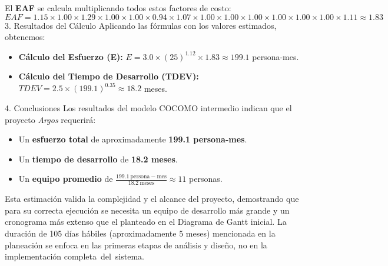 El \textbf{EAF} se calcula multiplicando todos estos factores de costo:
$EAF = 1.15 \times 1.00 \times 1.29 \times 1.00 \times 1.00 \times 0.94 \times 1.07 \times 1.00 \times 1.00 \times 1.00 \times 1.00 \times 1.00 \times 1.00 \times 1.11 \approx 1.83$
 3. Resultados del Cálculo
Aplicando las fórmulas con los valores estimados, obtenemos:
\begin{itemize}
    \item \textbf{Cálculo del Esfuerzo (E):}
    $E = 3.0 \times \left(25\right)^{1.12} \times 1.83 \approx 199.1$ persona-mes.
    \item \textbf{Cálculo del Tiempo de Desarrollo (TDEV):}
    $TDEV = 2.5 \times \left(199.1\right)^{0.35} \approx 18.2$ meses.
\end{itemize}

4. Conclusiones
Los resultados del modelo COCOMO intermedio indican que el proyecto \textit{Argos} requerirá:
\begin{itemize}
    \item Un \textbf{esfuerzo total} de aproximadamente \textbf{199.1 persona-mes}.
    \item Un \textbf{tiempo de desarrollo} de \textbf{18.2 meses}.
    \item Un \textbf{equipo promedio} de $\frac{199.1\ \mathrm{persona-mes}}{18.2\ \mathrm{meses}} \approx 11$ personas.
\end{itemize}
Esta estimación valida la complejidad y el alcance del proyecto, demostrando que para su correcta ejecución se necesita un equipo de desarrollo más grande y un cronograma más extenso que el planteado en el Diagrama de Gantt inicial. La duración de 105 días hábiles (aproximadamente 5 meses) mencionada en la planeación se enfoca en las primeras etapas de análisis y diseño, no en la implementación completa del sistema.